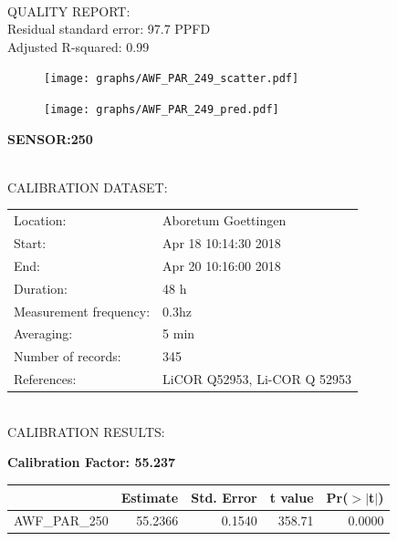 \documentclass[oneside]{report}
\begin{document}
\hrulefill\\
QUALITY REPORT:\\
Residual standard error: 97.7 PPFD\\
Adjusted R-squared: 0.99



\begin{figure}[H]
  \centering
  \texttt{[image: graphs/AWF\_PAR\_249\_scatter.pdf]}
\end{figure}




\begin{figure}[H]
  \centering
  \texttt{[image: graphs/AWF\_PAR\_249\_pred.pdf]}
\end{figure}

\pagebreak


\begin{center}
\large{\textbf{SENSOR:250}}\\
\end{center}

\hrulefill\\
CALIBRATION DATASET:\\
\begin{table}[h!]
  \centering
  \label{tab:table1}
  \begin{tabular}{ll}
    Location: & Aboretum Goettingen\\ 
    
    
    Start:  & Apr 18 10:14:30 2018 \\
    End:   & Apr 20 10:16:00 2018\\ 
    Duration: & 48 h\\
    Measurement frequency: & 0.3hz\\
    Averaging:  &5 min\\
    Number of records: & 345 \\
    References: & LiCOR Q52953, Li-COR Q 52953 \\
  \end{tabular}
\end{table}

\hrulefill\\
CALIBRATION RESULTS:\\


\begin{center}
\textbf{\large{Calibration Factor: 55.237}}\\
\end{center}
\begin{table}[ht]
\centering
\begin{tabular}{rrrrr}
  \hline
 & Estimate & Std. Error & t value & Pr($>$$|$t$|$) \\ 
  \hline
AWF\_PAR\_250 & 55.2366 & 0.1540 & 358.71 & 0.0000 \\ 
   \hline
\end{tabular}
\end{table}
\end{document}
